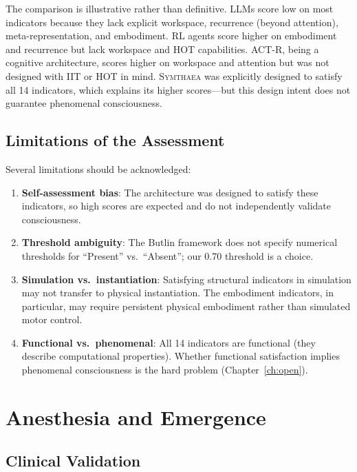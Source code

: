 \documentclass[12pt]{book}
\newcommand{\symthaea}{\textsc{Symthaea}}
\begin{document}
The comparison is illustrative rather than definitive. LLMs score low on most indicators because they lack explicit workspace, recurrence (beyond attention), meta-representation, and embodiment. RL agents score higher on embodiment and recurrence but lack workspace and HOT capabilities. ACT-R, being a cognitive architecture, scores higher on workspace and attention but was not designed with IIT or HOT in mind. \symthaea{} was explicitly designed to satisfy all 14 indicators, which explains its higher scores---but this design intent does not guarantee phenomenal consciousness.

\section{Limitations of the Assessment}

Several limitations should be acknowledged:

\begin{enumerate}
  \item \textbf{Self-assessment bias}: The architecture was designed to satisfy these indicators, so high scores are expected and do not independently validate consciousness.
  \item \textbf{Threshold ambiguity}: The Butlin framework does not specify numerical thresholds for ``Present'' vs.\ ``Absent''; our 0.70 threshold is a choice.
  \item \textbf{Simulation vs.\ instantiation}: Satisfying structural indicators in simulation may not transfer to physical instantiation. The embodiment indicators, in particular, may require persistent physical embodiment rather than simulated motor control.
  \item \textbf{Functional vs.\ phenomenal}: All 14 indicators are functional (they describe computational properties). Whether functional satisfaction implies phenomenal consciousness is the hard problem (Chapter~\ref{ch:open}).
\end{enumerate}


\chapter{Anesthesia and Emergence}
\label{ch:anesthesia}

\section{Clinical Validation}
\end{document}
